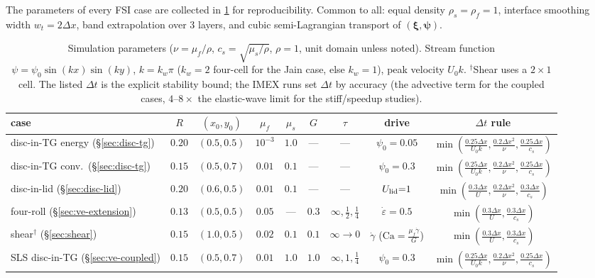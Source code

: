 \documentclass[final,3p,times]{elsarticle}
\theoremstyle{remark}
\newcommand{\xiv}{\bm{\xi}}              %
\newcommand{\psib}{\bm{\psi}}           %
\newcommand{\dt}{\Delta t}
\newcommand{\dx}{\Delta x}
\begin{document}

The parameters of every FSI case are collected in \cref{tab:params} for reproducibility.
Common to all: equal density $\rho_s=\rho_f=1$, interface smoothing width $w_t=2\dx$, band
extrapolation over $3$ layers, and cubic semi-Lagrangian transport of $(\xiv,\psib)$.

\begin{table}[t]\centering\small
\caption{Simulation parameters ($\nu=\mu_f/\rho$, $c_s=\sqrt{\mu_s/\rho}$, $\rho=1$, unit domain
unless noted). Stream function $\psi=\psi_0\sin(k x)\sin(k y)$, $k=k_w\pi$ ($k_w{=}2$ four-cell for
the Jain case, else $k_w{=}1$), peak velocity $U_0 k$. $^{\dagger}$Shear uses a $2\times1$ cell. The
listed $\dt$ is the explicit stability bound; the IMEX runs set $\dt$ by accuracy (the advective
term for the coupled cases, $4$--$8\times$ the elastic-wave limit for the stiff/speedup studies).}
\label{tab:params}
\begin{tabular}{@{}lcccccccc@{}}
\toprule
case & $R$ & $(x_0,y_0)$ & $\mu_f$ & $\mu_s$ & $G$ & $\tau$ & drive & $\dt$ rule \\
\midrule
disc-in-TG energy (\S\ref{sec:disc-tg}) & $0.20$ & $(0.5,0.5)$ & $10^{-3}$ & $1.0$ & --- & --- &
$\psi_0{=}0.05$ & $\min(\tfrac{0.25\dx}{U_0 k},\tfrac{0.2\dx^2}{\nu},\tfrac{0.25\dx}{c_s})$ \\
disc-in-TG conv.\ (\S\ref{sec:disc-tg}) & $0.15$ & $(0.5,0.7)$ & $0.01$ & $0.1$ & --- & --- &
$\psi_0{=}0.3$ & $\min(\tfrac{0.25\dx}{U_0 k},\tfrac{0.2\dx^2}{\nu},\tfrac{0.25\dx}{c_s})$ \\
disc-in-lid (\S\ref{sec:disc-lid}) & $0.20$ & $(0.6,0.5)$ & $0.01$ & $0.1$ & --- & --- &
$U_{\rm lid}{=}1$ & $\min(\tfrac{0.3\dx}{U},\tfrac{0.2\dx^2}{\nu},\tfrac{0.3\dx}{c_s})$ \\
four-roll (\S\ref{sec:ve-extension}) & $0.13$ & $(0.5,0.5)$ & $0.05$ & --- & $0.3$ &
$\infty,\tfrac12,\tfrac14$ & $\dot\varepsilon{=}0.5$ & $\min(\tfrac{0.3\dx}{U},\tfrac{0.3\dx}{c_s})$ \\
shear$^{\dagger}$ (\S\ref{sec:shear}) & $0.15$ & $(1.0,0.5)$ & $0.02$ & $0.1$ & $0.1$ & $\infty\!\to\!0$ &
$\dot\gamma$ ($\mathrm{Ca}{=}\tfrac{\mu_f\dot\gamma}{G}$) & $\min(\tfrac{0.3\dx}{U},\tfrac{0.3\dx}{c_s})$ \\
SLS disc-in-TG (\S\ref{sec:ve-coupled}) & $0.15$ & $(0.5,0.7)$ & $0.01$ & $1.0$ &
$1.0$ & $\infty,1,\tfrac14$ & $\psi_0{=}0.3$ & $\min(\tfrac{0.25\dx}{U_0 k},\tfrac{0.2\dx^2}{\nu},\tfrac{0.25\dx}{c_s})$ \\
\bottomrule
\end{tabular}
\end{table}
\end{document}
